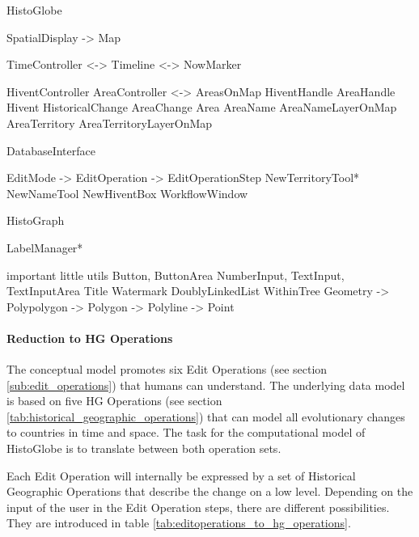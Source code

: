 HistoGlobe

SpatialDisplay -> Map

TimeController  <-> Timeline
                <-> NowMarker

HiventController                AreaController <->  AreasOnMap
HiventHandle                    AreaHandle
Hivent
HistoricalChange    AreaChange  Area
                                AreaName            AreaNameLayerOnMap
                                AreaTerritory       AreaTerritoryLayerOnMap

DatabaseInterface

EditMode -> EditOperation -> EditOperationStep
NewTerritoryTool* NewNameTool NewHiventBox
WorkflowWindow

HistoGraph

LabelManager*

important little utils
  Button, ButtonArea
  NumberInput, TextInput, TextInputArea
  Title
  Watermark
  DoublyLinkedList
  WithinTree
  Geometry -> Polypolygon -> Polygon -> Polyline -> Point

\paragraph{Reduction to HG Operations} %
\label{par:reduction_to_hg_operations}

The conceptual model promotes six Edit Operations (see section \ref{sub:edit_operations}) that humans can understand.
The underlying data model is based on five HG Operations (see section \ref{tab:historical_geographic_operations}) that can model all evolutionary changes to countries in time and space. The task for the computational model of HistoGlobe is to translate between both operation sets.


Each Edit Operation will internally be expressed by a set of Historical Geographic Operations that describe the change on a low level. Depending on the input of the user in the Edit Operation steps, there are different possibilities. They are introduced in table \ref{tab:editoperations_to_hg_operations}.

